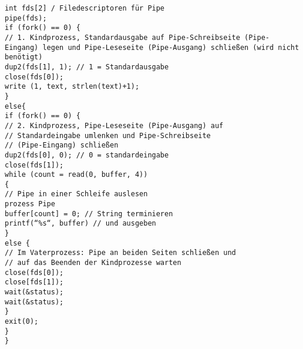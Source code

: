 \begin{verbatim}
int fds[2] / Filedescriptoren für Pipe
pipe(fds);
if (fork() == 0) {
// 1. Kindprozess, Standardausgabe auf Pipe-Schreibseite (Pipe-Eingang) legen und Pipe-Leseseite (Pipe-Ausgang) schließen (wird nicht benötigt)
dup2(fds[1], 1); // 1 = Standardausgabe
close(fds[0]);
write (1, text, strlen(text)+1);
}
else{
if (fork() == 0) {
// 2. Kindprozess, Pipe-Leseseite (Pipe-Ausgang) auf
// Standardeingabe umlenken und Pipe-Schreibseite
// (Pipe-Eingang) schließen
dup2(fds[0], 0); // 0 = standardeingabe
close(fds[1]);
while (count = read(0, buffer, 4))
{
// Pipe in einer Schleife auslesen
prozess Pipe
buffer[count] = 0; // String terminieren
printf(“%s“, buffer) // und ausgeben
}
else {
// Im Vaterprozess: Pipe an beiden Seiten schließen und
// auf das Beenden der Kindprozesse warten
close(fds[0]);
close[fds[1]);
wait(&status);
wait(&status);
}
exit(0);
}
}
\end{verbatim}